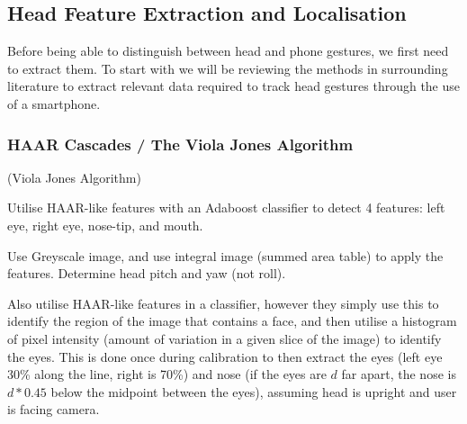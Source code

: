 \subsection{Head Feature Extraction and Localisation}

Before being able to distinguish between head and phone gestures, we first need to extract them. To start with we will be reviewing the methods in surrounding literature to extract relevant data required to track head gestures through the use of a smartphone.


\subsubsection{HAAR Cascades / The Viola Jones Algorithm}\nl
(Viola Jones Algorithm\cite{viola2004robust})

\cite{kim2017real} Utilise HAAR-like features with an Adaboost classifier to detect 4 features: left eye, right eye, nose-tip, and mouth.

Use Greyscale image, and use integral image (summed area table) to apply the features.
Determine head pitch and yaw (not roll).

\cite{neto2012real} Also utilise HAAR-like features in a classifier, however they simply use this to identify the region of the image that contains a face, and then utilise a histogram of pixel intensity (amount of variation in a given slice of the image) to identify the eyes.
This is done once during calibration to then extract the eyes (left eye 30\% along the line, right is 70\%) and nose (if the eyes are $d$ far apart, the nose is $d*0.45$ below the midpoint between the eyes), assuming head is upright and user is facing camera.

